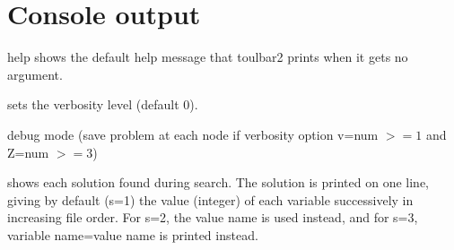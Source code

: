 \documentclass[letterpaper,10pt,openany,oneside,english]{sphinxmanual}
\begin{document}
\section{Console output}
\label{\detokenize{userdoc:console-output}}\begin{optionlist}{3cm}
\item [\sphinxhyphen{}help]  
\sphinxAtStartPar
shows the default help message that toulbar2 prints when
it gets no argument.
\end{optionlist}
\begin{description}
\sphinxAtStartPar
sets the verbosity level (default 0).

\sphinxAtStartPar
debug mode (save problem at each node if verbosity
option \sphinxhyphen{}v=num \(>= 1\) and \sphinxhyphen{}Z=num \(>=3\))

\sphinxAtStartPar
shows each solution found during search. The solution is
printed on one line, giving by default (\sphinxhyphen{}s=1) the value (integer)
of each variable successively
in increasing file order. For \sphinxhyphen{}s=2, the value name is used instead,
and for \sphinxhyphen{}s=3, variable name=value name is printed instead.

\end{description}
\end{document}
